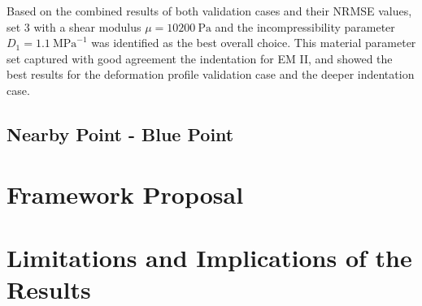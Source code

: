 Based on the combined results of both validation cases and their NRMSE values, set 3 with a 
shear modulus $\mu=\SI{10200}{\pascal}$ and the incompressibility parameter $D_1=\SI{1.1}{\mega\pascal\tothe{-1}}$ 
was identified as the best overall choice. This material parameter set captured with good 
agreement the indentation for EM II, and showed the best results for the deformation profile 
validation case and the deeper indentation case.  

\subsection{Nearby Point - Blue Point}
\label{subsection:bluepoint}


\section{Framework Proposal}

\section{Limitations and Implications of the Results}




